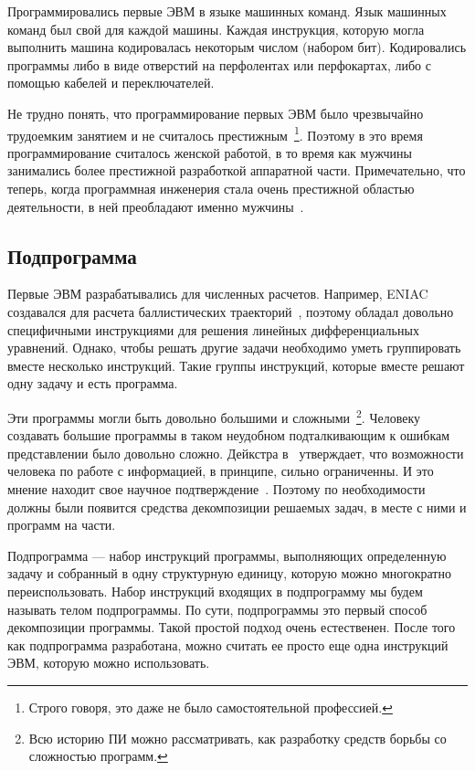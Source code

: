 Программировались первые ЭВМ в языке машинных команд. Язык машинных команд был свой для каждой машины. Каждая инструкция, которую могла выполнить машина кодировалась некоторым числом (набором бит). Кодировались программы либо в виде отверстий на перфолентах или перфокартах, либо с помощью кабелей и переключателей.

Не трудно понять, что программирование первых ЭВМ было чрезвычайно трудоемким занятием и не считалось престижным~\footnote{Строго говоря, это даже не было самостоятельной профессией.}. Поэтому в это время программирование считалось женской работой, в то время как мужчины занимались более престижной разработкой аппаратной части. Примечательно, что теперь, когда программная инженерия стала очень престижной областью деятельности, в ней преобладают именно мужчины~\cite{CSWOMEN}.

\subsection{Подпрограмма}

Первые ЭВМ разрабатывались для численных расчетов. Например, ENIAC создавался для расчета баллистических траекторий~\cite{Randall:2006:ENIAC}, поэтому обладал довольно специфичными инструкциями для решения линейных дифференциальных уравнений. Однако, чтобы решать другие задачи необходимо уметь группировать вместе несколько инструкций. Такие группы инструкций, которые вместе решают одну задачу и есть программа.

Эти программы могли быть довольно большими и сложными~\footnote{Всю историю ПИ можно рассматривать, как разработку средств борьбы со сложностью программ.}. Человеку создавать большие программы в таком неудобном подталкивающим к ошибкам представлении было довольно сложно. Дейкстра в~\cite{Dijkstra:1972:CIN} утверждает, что возможности человека по работе с информацией, в принципе, сильно ограниченны. И это мнение находит свое научное подтверждение~\cite{Miller}. Поэтому по необходимости должны были появится средства декомпозиции решаемых задач, в месте с ними и программ на части.

Подпрограмма — набор инструкций программы, выполняющих определенную задачу и собранный в одну структурную единицу, которую можно многократно переиспользовать. Набор инструкций входящих в подпрограмму мы будем называть телом подпрограммы. По сути, подпрограммы это первый способ декомпозиции программы. Такой простой подход очень естественен. После того как подпрограмма разработана, можно считать ее просто еще одна инструкций ЭВМ, которую можно использовать.

